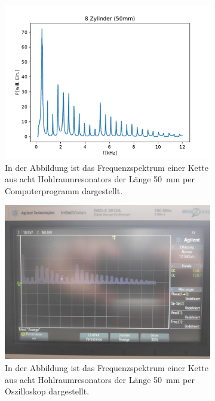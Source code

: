 \begin{figure}
            \centering
            \begin{subfigure}[b]{0.45\textwidth}
                \centering
                \includegraphics[scale=0.4]{./pictures/8_Zylinder_50mm.pdf}
                \caption{In der Abbildung ist das Frequenzspektrum einer Kette aus acht Hohlraumresonators der Länge \SI{50}{\milli\metre} per Computerprogramm dargestellt.}
            \end{subfigure}
            \hfill
            \centering
            \begin{subfigure}[b]{0.45\textwidth}
                \centering
                \includegraphics[scale=0.13]{./pictures/8_Zylinder.jpg}
                \caption{In der Abbildung ist das Frequenzspektrum einer Kette aus acht Hohlraumresonators der Länge \SI{50}{\milli\metre} per Oszilloskop dargestellt.}
            \end{subfigure}
            \caption{}
            \label{fig:pre_vgl}
        \end{figure}
    \FloatBarrier

